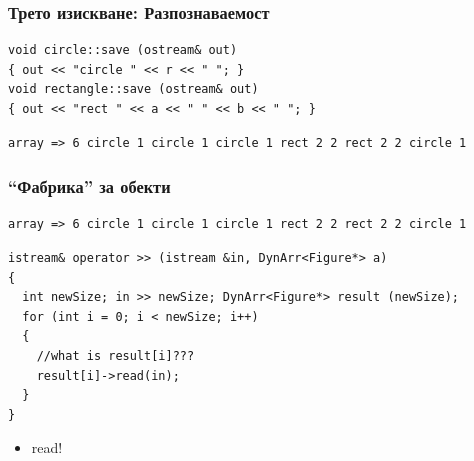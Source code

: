 \documentclass{beamer}
\begin{document}
\begin{frame}[fragile]
\frametitle{Трето изискване: Разпознаваемост}

\begin{flushleft}
\begin{lstlisting}
void circle::save (ostream& out)
{ out << "circle " << r << " "; }
void rectangle::save (ostream& out)
{ out << "rect " << a << " " << b << " "; }
\end{lstlisting}
\end{flushleft}

\begin{flushleft}
\begin{lstlisting}
array => 6 circle 1 circle 1 circle 1 rect 2 2 rect 2 2 circle 1
\end{lstlisting}
\end{flushleft}

\end{frame}



\begin{frame}[fragile]
\frametitle{``Фабрика'' за обекти}


\begin{flushleft}
\begin{lstlisting}
array => 6 circle 1 circle 1 circle 1 rect 2 2 rect 2 2 circle 1
\end{lstlisting}
\end{flushleft}

\begin{flushleft}
\begin{lstlisting}
istream& operator >> (istream &in, DynArr<Figure*> a)
{
  int newSize; in >> newSize; DynArr<Figure*> result (newSize);
  for (int i = 0; i < newSize; i++)
  {
    //what is result[i]???
    result[i]->read(in);
  }
}
\end{lstlisting}
\end{flushleft}
\begin{itemize}
  \item read!
\end{itemize}

\end{frame}
\end{document}
